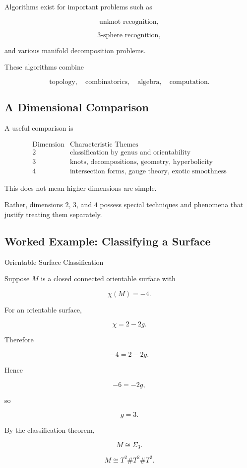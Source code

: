 Algorithms exist for important problems such as

\[
\boxed{
\text{unknot recognition},
}
\]

\[
\boxed{
3\text{-sphere recognition},
}
\]

and various manifold decomposition problems.

These algorithms combine

\[
\boxed{
\text{topology},
\quad
\text{combinatorics},
\quad
\text{algebra},
\quad
\text{computation}.
}
\]

\subsection{A Dimensional Comparison}
\label{subsec:dimensional-comparison-topology}

A useful comparison is

\[
\boxed{
\begin{array}{c|c}
\text{Dimension} & \text{Characteristic Themes}\\
\hline
2 & \text{classification by genus and orientability}\\
3 & \text{knots, decompositions, geometry, hyperbolicity}\\
4 & \text{intersection forms, gauge theory, exotic smoothness}
\end{array}
}
\]

This does not mean higher dimensions are simple.

Rather, dimensions \(2\), \(3\), and \(4\) possess special techniques and
phenomena that justify treating them separately.

\subsection{Worked Example: Classifying a Surface}
\label{subsec:worked-classifying-surface}

\begin{workedexamplebox}{Orientable Surface Classification}

Suppose \(M\) is a closed connected orientable surface with

\[
\chi(M)=-4.
\]

For an orientable surface,

\[
\chi=2-2g.
\]

Therefore

\[
-4=2-2g.
\]

Hence

\[
-6=-2g,
\]

so

\[
g=3.
\]

By the classification theorem,

\[
M\cong\Sigma_3.
\]

\begin{answerbox}
\[
\boxed{
M\cong T^2\#T^2\#T^2.
}
\]
\end{answerbox}
\end{workedexamplebox}

